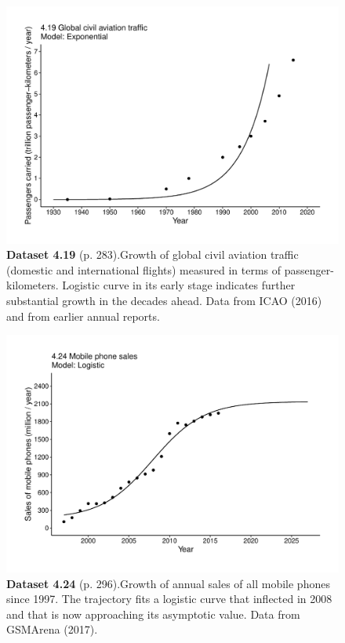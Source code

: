 \documentclass[aps,rmp,preprint,superscriptaddress,10pt,onecolumn]{article}
\begin{document}
\clearpage
\begin{figure}[h]
\includegraphics[width=\textwidth]{output/figs-ggplot/4.19.pdf}
\caption*{\textbf{Dataset 4.19} (p. 283).Growth of global civil aviation traffic (domestic and international flights) measured in terms of passenger-kilometers. Logistic curve in its early stage indicates further substantial growth in the decades ahead. Data from ICAO (2016) and from earlier annual reports. }
\end{figure}
	
\clearpage
\begin{figure}[h]
\includegraphics[width=\textwidth]{output/figs-ggplot/4.24.pdf}
\caption*{\textbf{Dataset 4.24} (p. 296).Growth of annual sales of all mobile phones since 1997. The trajectory fits a logistic curve that inflected in 2008 and that is now approaching its asymptotic value. Data from GSMArena (2017).}
\end{figure}
	
\end{document}
